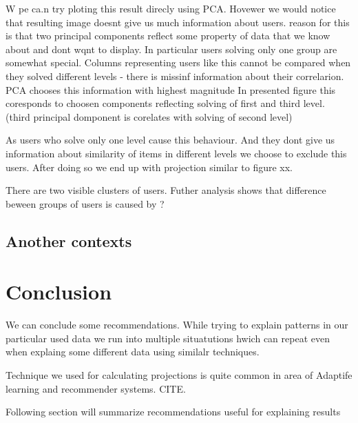 \documentclass[
  digital, %
  table,   %
  nolof,     %
  nolot,     %
  nocover
]{fithesis3}
\begin{document}
W pe ca.n try ploting this result direcly using PCA. Hovewer we would
notice that resulting image doesnt give us much information about users.
reason for this is that two principal components reflect some property
of data that we know about and dont wqnt to display. In particular users
solving only one group are somewhat special. Columns representing users
like this cannot be compared when they solved different levels - there
is missinf information about their correlarion. PCA chooses this
information with highest magnitude In presented figure this coresponds
to choosen components reflecting solving of first and third level.
(third principal domponent is corelates with solving of second level)

As users who solve only one level cause this behaviour. And they dont
give us information about similarity of items in different levels we
choose to exclude this users. After doing so we end up with projection
similar to figure xx.

There are two visible clusters of users. Futher analysis shows that
difference beween groups of users is caused by ?

\section{Another contexts}\label{another-contexts}



\chapter{Conclusion}


We can conclude some recommendations. While trying to explain patterns
in our particular used data we run into multiple situatutions hwich can
repeat even when explaing some different data using similalr techniques.

Technique we used for calculating projections is quite common in area of
Adaptife learning and recommender systems. CITE.


Following section will summarize recommendations useful for explaining
results
\end{document}
